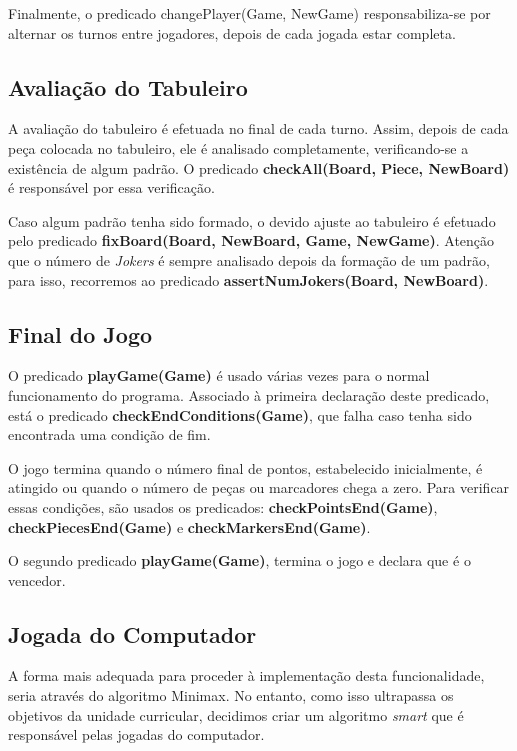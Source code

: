 \documentclass[a4paper]{article}
\begin{document}
Finalmente, o predicado changePlayer(Game, NewGame) responsabiliza-se por alternar os turnos entre jogadores, depois de cada jogada estar completa.

\subsection{Avaliação do Tabuleiro\newline}

A avaliação do tabuleiro é efetuada no final de cada turno. Assim, depois de cada peça colocada no tabuleiro, ele é analisado completamente, verificando-se a existência de algum padrão. O predicado \textbf{checkAll(Board, Piece, NewBoard)} é responsável por essa verificação.

Caso algum padrão tenha sido formado, o devido ajuste ao tabuleiro é efetuado pelo predicado \textbf{fixBoard(Board, NewBoard, Game, NewGame)}. Atenção que o número de \textit{Jokers} é sempre analisado depois da formação de um padrão, para isso, recorremos ao predicado \textbf{assertNumJokers(Board, NewBoard)}.

\subsection{Final do Jogo\newline}

O predicado \textbf{playGame(Game)} é usado várias vezes para o normal funcionamento do programa. Associado à primeira declaração deste predicado, está o predicado \textbf{checkEndConditions(Game)}, que falha caso tenha sido encontrada uma condição de fim. 

O jogo termina quando o número final de pontos, estabelecido inicialmente, é atingido ou quando o número de peças ou marcadores chega a zero. Para verificar essas condições, são usados os predicados: \textbf{checkPointsEnd(Game)}, \textbf{checkPiecesEnd(Game)} e \textbf{checkMarkersEnd(Game)}.

O segundo predicado \textbf{playGame(Game)}, termina o jogo e declara que é o vencedor.

\subsection{Jogada do Computador\newline}

A forma mais adequada para proceder à implementação desta funcionalidade, seria através do algoritmo Minimax. No entanto, como isso ultrapassa os objetivos da unidade curricular, decidimos criar um algoritmo \textit{smart} que é responsável pelas jogadas do computador. 
\end{document}
